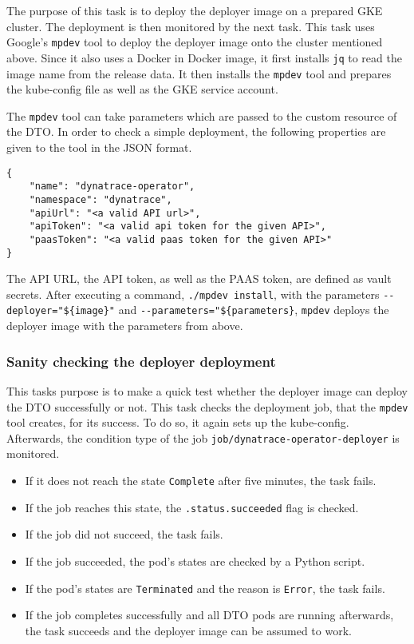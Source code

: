The purpose of this task is to deploy the deployer image on a prepared GKE cluster.
The deployment is then monitored by the next task.
This task uses Google's \verb|mpdev| tool to deploy the deployer image onto the cluster mentioned above.
Since it also uses a Docker in Docker image, it first installs \verb|jq| to read the image name from the release data.
It then installs the \verb|mpdev| tool and prepares the kube-config file as well as the GKE service account.

The \verb|mpdev| tool can take parameters which are passed to the custom resource of the DTO.
In order to check a simple deployment, the following properties are given to the tool in the JSON format.

\begin{verbatim}
{
    "name": "dynatrace-operator",
    "namespace": "dynatrace",
    "apiUrl": "<a valid API url>",
    "apiToken": "<a valid api token for the given API>",
    "paasToken": "<a valid paas token for the given API>"
}
\end{verbatim}

The API URL, the API token, as well as the PAAS token, are defined as vault secrets.
After executing a command, \verb|./mpdev install|, with the parameters \verb|--deployer="${image}"| and \verb|--parameters="${parameters}|, \verb|mpdev| deploys the deployer image with the parameters from above.

\subsubsection{Sanity checking the deployer deployment}\label{subsubsec:sanity-check-deployer}

This tasks purpose is to make a quick test whether the deployer image can deploy the DTO successfully or not.
This task checks the deployment job, that the \verb|mpdev| tool creates, for its success.
To do so, it again sets up the kube-config.
Afterwards, the condition type of the job \verb|job/dynatrace-operator-deployer| is monitored.

\begin{itemize}
    \item If it does not reach the state \verb|Complete| after five minutes, the task fails.
    \item If the job reaches this state, the \verb|.status.succeeded| flag is checked.
    \item If the job did not succeed, the task fails.
    \item If the job succeeded, the pod's states are checked by a Python script.
    \item If the pod's states are \verb|Terminated| and the reason is \verb|Error|, the task fails.
    \item If the job completes successfully and all DTO pods are running afterwards, the task succeeds and the deployer image can be assumed to work.
\end{itemize}
